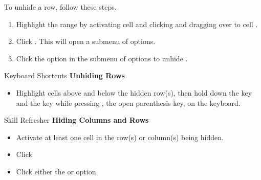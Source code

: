To unhide a row, follow these steps.

\begin{enumerate}
	\item Highlight the range  by activating cell  and clicking and dragging over to cell .
	\item Click . This will open a submenu of options.
	\item Click the  option in the submenu of options to unhide .
\end{enumerate}

\begin{center}
	\begin{shtcutbox}{Keyboard Shortcuts}
		\textbf{Unhiding Rows}
		\\
		\begin{itemize}
			\setlength{\itemsep}{0pt}
			\setlength{\parskip}{0pt}
			\setlength{\parsep}{0pt}
			
			\item Highlight cells above and below the hidden row(s), then hold down the  key and the  key while pressing \fmtKeystroke{(}, the open parenthesis key, on the keyboard.
			
		\end{itemize}
	\end{shtcutbox}
\end{center}

\begin{center}
	\begin{sklbox}{Skill Refresher}
		\textbf{Hiding Columns and Rows}
		\\
		\begin{itemize}
			\setlength{\itemsep}{0pt}
			\setlength{\parskip}{0pt}
			\setlength{\parsep}{0pt}
			
			\item Activate at least one cell in the row(s) or column(s) being hidden.
			\item Click 
			\item Click either the  or  option.
			
		\end{itemize}
	\end{sklbox}
\end{center}


